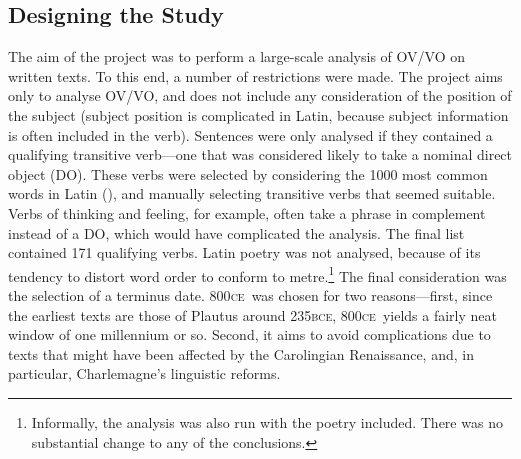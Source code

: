 \documentclass[11pt,a4paper]{scrartcl} %
\newcommand{\ce}{\textsc{ce}\ }
\begin{document}
\subsection{Designing the Study}
The aim of the project was to perform a large-scale analysis of OV/VO on written texts. To this end, a number of restrictions were made. The project aims only to analyse OV/VO, and does not include any consideration of the position of the subject (subject position is complicated in Latin, because subject information is often included in the verb). Sentences were only analysed if they contained a qualifying transitive verb---one that was considered likely to take a nominal direct object (DO). These verbs were selected by considering the 1000 most common words in Latin (\cite{vocab}), and manually selecting transitive verbs that seemed suitable. Verbs of thinking and feeling, for example, often take a phrase in complement instead of a DO, which would have complicated the analysis. The final list contained 171 qualifying verbs. Latin poetry was not analysed, because of its tendency to distort word order to conform to metre.\footnote{Informally, the analysis was also run with the poetry included. There was no substantial change to any of the conclusions.} The final consideration was the selection of a terminus date. 800\ce was chosen for two reasons---first, since the earliest texts are those of Plautus around 235\textsc{bce}, 800\ce yields a fairly neat window of one millennium or so. Second, it aims to avoid complications due to texts that might have been affected by the Carolingian Renaissance, and, in particular, Charlemagne's linguistic reforms.
\end{document}
